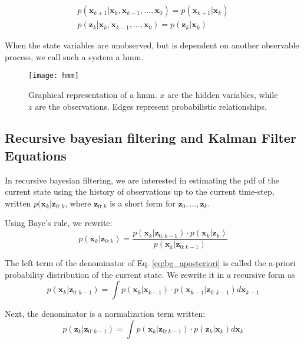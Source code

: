 \begin{align}
  p(\bm{x}_{k+1}|\bm{x}_{k}, \bm{x}_{k-1},\ldots,\bm{x}_{0})=p(\bm{x}_{k+1}|\bm{x}_{k})\\
  p(\bm{z}_{k}|\bm{x}_{k}, \bm{x}_{k-1},\ldots,\bm{x}_{0})=p(\bm{z}_{k}|\bm{x}_{k})
\end{align}

When the state variables are unobserved, but is dependent on another observable process, we call such a system a \gls{hmm}.

\begin{figure}[!htpb]
  \centering
  \texttt{[image: hmm]}
  \caption{Graphical representation of a \gls{hmm}. $x$ are the hidden variables, while $z$ are the observations.
  Edges represent probabilistic relationships.}
  \label{fig:hmm}
\end{figure}

\subsection{Recursive bayesian filtering and Kalman Filter Equations}
In recursive bayesian filtering, we are interested in estimating the \gls{pdf} of the current state using the history of observations up to the current time-step, written $p(\bm{x}_{k}|\bm{z}_{0:k}$, where $\bm{z}_{0:k}$ is a short form for $\bm{z}_{0},\ldots, \bm{z}_{k}$.

Using Baye's rule, we rewrite:
\begin{equation}
  \label{eq:bg_aposteriori}
  p(\bm{x}_{k}|\bm{z}_{0:k}) = \frac{p(\bm{x}_{k}|\bm{z}_{0:k-1})\cdot p(\bm{x}_{k}|\bm{z}_{k})}{p(\bm{x}_{k}|\bm{z}_{0:k-1})}
\end{equation}

The left term of the denominator of Eq. \ref{eq:bg_aposteriori} is called the a-priori probability distribution of the current state.
We rewrite it in a recursive form as
\begin{equation}
  \label{eq:bg_prior}
  p(\bm{x}_{k}|\bm{z}_{0:k-1}) = \int p(\bm{x}_{k}|\bm{x}_{k-1}) \cdot p(\bm{x}_{k-1}|\bm{z}_{0:k-1}) d\bm{x}_{k-1}
\end{equation}

Next, the denominator is a normalization term written:
\begin{equation}
  \label{eq:bg_norm_cst}
  p(\bm{z}_{k}|\bm{z}_{0:k-1}) = \int p(\bm{x}_{k}|\bm{z}_{0:k-1}) \cdot p(\bm{z}_{k}|\bm{x}_{k}) d\bm{x}_{k}
\end{equation}

